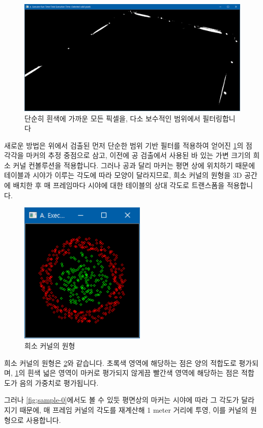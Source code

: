 \documentclass[10pt]{oblivoir}
\begin{document}
\begin{figure}[ht]
    \centering
    \includegraphics[width=12cm]{img/new-pp0.png}
    \caption{단순히 흰색에 가까운 모든 픽셀을, 다소 보수적인 범위에서 필터링합니다}
    \label{fig;new-pp0}
\end{figure}

새로운 방법은 위에서 검출된 먼저 단순한 범위 기반 필터를 적용하여 얻어진 \cref{fig;new-pp0}의 점 각각을 마커의 추정 중점으로 삼고, 이전에 공 검출에서 사용된 바 있는 가변 크기의 희소 커널 컨볼루션을 적용합니다. 그러나 공과 달리 마커는 평면 상에 위치하기 때문에 테이블과 시야가 이루는 각도에 따라 모양이 달라지므로, 희소 커널의 원형을 3D 공간에 배치한 후 매 프레임마다 시야에 대한 테이블의 상대 각도로 트랜스폼을 적용합니다.

\begin{figure}[ht]
    \centering
    \includegraphics[width=6cm]{img/kernel-source.png}
    \caption{희소 커널의 원형}
    \label{fig;kernel-src}
\end{figure}

희소 커널의 원형은 \cref{fig;kernel-src}와 같습니다. 초록색 영역에 해당하는 점은 양의 적합도로 평가되며, \cref{fig;new-pp0}의 흰색 넓은 영역이 마커로 평가되지 않게끔 빨간색 영역에 해당하는 점은 적합도가 음의 가중치로 평가됩니다.

그러나 \cref{fig;sample-0}에서도 볼 수 있듯 평면상의 마커는 시야에 따라 그 각도가 달라지기 때문에, 매 프레임 커널의 각도를 재계산해 1 meter 거리에 투영, 이를 커널의 원형으로 사용합니다.
\end{document}

